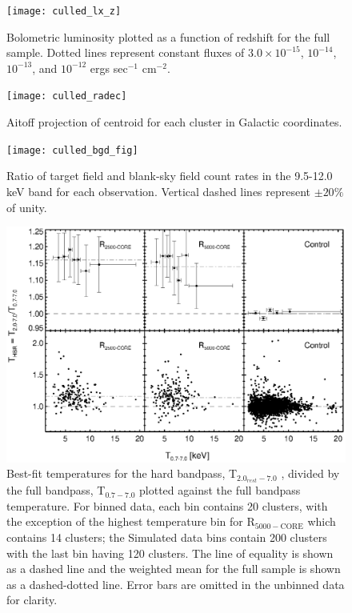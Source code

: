 \documentclass{emulateapj}
\newcommand{\hard}{T$_{2.0_{rest}-7.0}$ }
\newcommand{\full}{T$_{0.7-7.0}$ }
\begin{document}
{\clearpage
\begin{figure}[htp]
\begin{center}
\texttt{[image: culled\_lx\_z]}
\caption{\small Bolometric luminosity plotted as a function of redshift for the
full sample. Dotted lines represent constant fluxes of $3.0\times10^{-15}$,
$10^{-14}$, $10^{-13}$, and $10^{-12}$ ergs sec$^{-1}$ cm$^{-2}$.}
\label{fig:lx_z}
\end{center}
\end{figure}

\clearpage
\begin{figure}[htp]
\begin{center}
\texttt{[image: culled\_radec]}
\caption{\small Aitoff projection of centroid for each cluster in
Galactic coordinates.}
\label{fig:radec}
\end{center}
\end{figure}

\clearpage
\begin{figure}[htp]
\begin{center}
\texttt{[image: culled\_bgd\_fig]}
\caption{\small Ratio of target field and blank-sky field
count rates in the 9.5-12.0 keV band for each observation. Vertical
dashed lines represent $\pm 20\%$ of unity.}
\label{fig:bgd}
\end{center}
\end{figure}

\clearpage
\begin{figure}[htp]
\begin{center}
\includegraphics[scale=1.0]{ftxcount}
\caption{\small Best-fit temperatures for the hard bandpass,
\hard, divided by the full bandpass, \full plotted
against the full bandpass temperature. For binned data, each bin
contains 20 clusters, with the exception of the highest temperature
bin for R$_{5000-\text{CORE}}$ which contains 14 clusters; the
Simulated data bins contain 200 clusters with the last bin having 120
clusters. The line of equality is shown as a dashed line and the weighted
mean for the full sample is shown as a dashed-dotted line. Error
bars are omitted in the unbinned data for clarity.}
\label{fig:ftx}
\end{center}
\end{figure}

}
\end{document}
